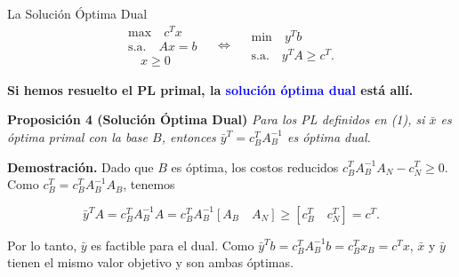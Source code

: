 \documentclass{beamer}
\begin{document}
\begin{frame}{La Solución Óptima Dual}
    \[
    \begin{array}{c}
    \text{max} \quad c^T x \\
    \text{s.a.} \quad Ax = b \\
    \quad x \geq 0
    \end{array}
    \quad \Leftrightarrow \quad
    \begin{array}{c}
    \text{min} \quad y^T b \\
    \text{s.a.} \quad y^T A \geq c^T.
    \end{array}
    \]

    \vspace{0.3cm}
    \textbf{Si hemos resuelto el PL primal, la \textcolor{blue}{solución óptima dual} está allí.}

    \vspace{0.5cm}
    \begin{block}{\textbf{Proposición 4 (Solución Óptima Dual)}}
        \textit{Para los PL definidos en (1), si \(\bar{x}\) es óptima primal con la base \( B \), entonces \(\bar{y}^T = c_B^T A_B^{-1}\) es óptima dual.}
    \end{block}

    \vspace{0.3cm}
    \textbf{Demostración.} Dado que \( B \) es óptima, los costos reducidos \( c_B^T A_B^{-1} A_N - c_N^T \geq 0 \). Como \( c_B^T = c_B^T A_B^{-1} A_B \), tenemos

    \[
    \bar{y}^T A = c_B^T A_B^{-1} A = c_B^T A_B^{-1} \left[ A_B \quad A_N \right] \geq \left[ c_B^T \quad c_N^T \right] = c^T.
    \]

    \vspace{0.3cm}
    Por lo tanto, \(\bar{y}\) es factible para el dual. Como \(\bar{y}^T b = c_B^T A_B^{-1} b = c_B^T x_B = c^T x\), \(\bar{x}\) y \(\bar{y}\) tienen el mismo valor objetivo y son ambas óptimas.
\end{frame}
\end{document}

